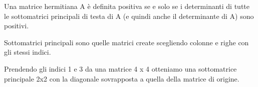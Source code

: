 \begin{theo}
\label{richiamibevilacqua:definitepositive}
Una matrice hermitiana A \`e definita positiva se e solo se i
determinanti di tutte le sottomatrici principali di testa di A (e quindi anche
il determinante di A) sono positivi.
\end{theo}

\begin{defn}
  Sottomatrici principali sono quelle matrici create scegliendo
  colonne e righe con gli stessi indici.
\end{defn}

\begin{example}
  Prendendo gli indici 1 e 3 da una matrice 4 x 4 otteniamo una
  sottomatrice principale 2x2 con la diagonale sovrapposta a quella
  della matrice di origine.
\end{example}



